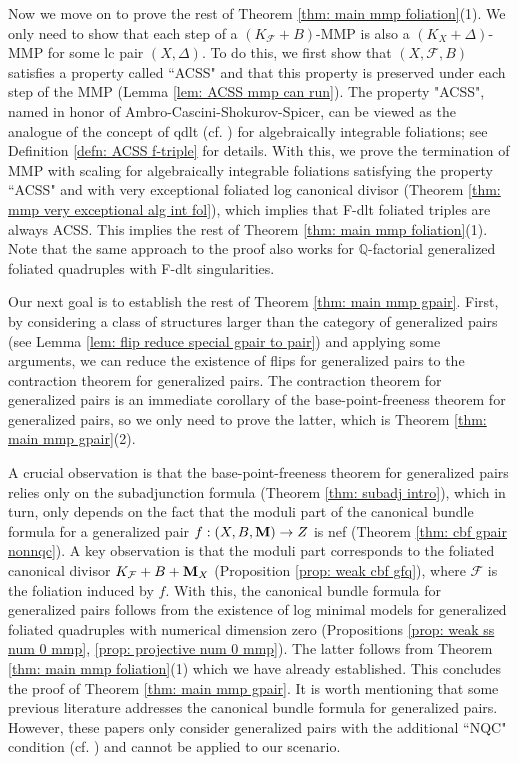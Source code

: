 \documentclass[11pt]{amsart}
\numberwithin{equation}{section}
\newcommand{\Mm}{{\bf{M}}}
\newcommand{\Qq}{\mathbb{Q}}
\newcommand{\Ff}{\mathcal{F}}
\theoremstyle{definition}
\theoremstyle{definition}
\theoremstyle{definition}
\begin{document}
Now we move on to prove the rest of Theorem \ref{thm: main mmp foliation}(1). We only need to show that each step of a $(K_{\Ff}+B)$-MMP is also a $(K_X+\Delta)$-MMP for some lc pair $(X,\Delta)$. To do this, we first show that $(X,\Ff,B)$ satisfies a property called ``ACSS" and that this property is preserved under each step of the MMP (Lemma \ref{lem: ACSS mmp can run}). The property "ACSS", named in honor of Ambro-Cascini-Shokurov-Spicer, can be viewed as the analogue of the concept of qdlt (cf. \cite{dFKX17}) for algebraically integrable foliations; see Definition \ref{defn: ACSS f-triple} for details. With this, we prove the termination of MMP with scaling for algebraically integrable foliations satisfying the property ``ACSS" and with very exceptional foliated log canonical divisor (Theorem \ref{thm: mmp very exceptional alg int fol}), which implies that F-dlt foliated triples are always ACSS. This implies the rest of Theorem \ref{thm: main mmp foliation}(1). Note that the same approach to the proof also works for $\Qq$-factorial generalized foliated quadruples with F-dlt singularities.

Our next goal is to establish the rest of Theorem \ref{thm: main mmp gpair}. First, by considering a class of structures larger than the category of generalized pairs (see Lemma \ref{lem: flip reduce special gpair to pair}) and applying some arguments, we can reduce the existence of flips for generalized pairs to the contraction theorem for generalized pairs. The contraction theorem for generalized pairs is an immediate corollary of the base-point-freeness theorem for generalized pairs, so we only need to prove the latter, which is Theorem \ref{thm: main mmp gpair}(2).

A crucial observation is that the base-point-freeness theorem for generalized pairs relies only on the subadjunction formula (Theorem \ref{thm: subadj intro}), which in turn, only depends on the fact that the moduli part of the canonical bundle formula for a generalized pair $f: (X,B,\Mm)\rightarrow Z$ is nef (Theorem \ref{thm: cbf gpair nonnqc}). A key observation is that the moduli part corresponds to the foliated canonical divisor $K_{\Ff}+B+\Mm_X$ (Proposition \ref{prop: weak cbf gfq}), where $\Ff$ is the foliation induced by $f$. With this, the canonical bundle formula for generalized pairs follows from the existence of log minimal models for generalized foliated quadruples with numerical dimension zero (Propositions \ref{prop: weak ss num 0 mmp}, \ref{prop: projective num 0 mmp}). The latter follows from Theorem \ref{thm: main mmp foliation}(1) which we have already established. This concludes the proof of Theorem \ref{thm: main mmp gpair}. It is worth mentioning that some previous literature addresses the canonical bundle formula for generalized pairs. However, these papers only consider generalized pairs with the additional ``NQC" condition (cf. \cite{Fil19,Fil20,JLX22,FS23}) and cannot be applied to our scenario.
\end{document}
